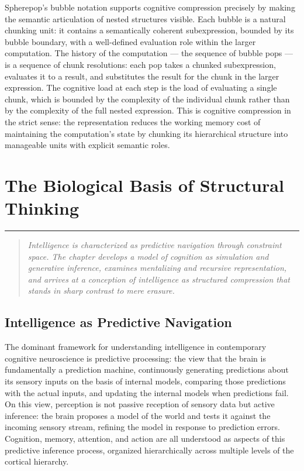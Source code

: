 \documentclass[12pt,openany]{book}
\theoremstyle{plain}
\theoremstyle{definition}
\theoremstyle{remark}
\newcommand{\chapterrule}{%
  \vspace{4pt}%
  {\color{SpherepopBlue}\rule{\textwidth}{0.8pt}}%
  \vspace{10pt}%
}
\newenvironment{chapterprecis}{%
  \begin{quote}\small\itshape}{%
  \end{quote}\medskip}
\begin{document}
Spherepop's bubble notation supports cognitive compression precisely by making the semantic articulation of nested structures visible. Each bubble is a natural chunking unit: it contains a semantically coherent subexpression, bounded by its bubble boundary, with a well-defined evaluation role within the larger computation. The history of the computation — the sequence of bubble pops — is a sequence of chunk resolutions: each pop takes a chunked subexpression, evaluates it to a result, and substitutes the result for the chunk in the larger expression. The cognitive load at each step is the load of evaluating a single chunk, which is bounded by the complexity of the individual chunk rather than by the complexity of the full nested expression. This is cognitive compression in the strict sense: the representation reduces the working memory cost of maintaining the computation's state by chunking its hierarchical structure into manageable units with explicit semantic roles.

\chapter{The Biological Basis of Structural Thinking}
\chapterrule

\begin{chapterprecis}
Intelligence is characterized as predictive navigation through
constraint space. The chapter develops a model of cognition as
simulation and generative inference, examines mentalizing and
recursive representation, and arrives at a conception of
intelligence as structured compression that stands in sharp
contrast to mere erasure.
\end{chapterprecis}

\section{Intelligence as Predictive Navigation}

The dominant framework for understanding intelligence in contemporary cognitive neuroscience is predictive processing: the view that the brain is fundamentally a prediction machine, continuously generating predictions about its sensory inputs on the basis of internal models, comparing those predictions with the actual inputs, and updating the internal models when predictions fail. On this view, perception is not passive reception of sensory data but active inference: the brain proposes a model of the world and tests it against the incoming sensory stream, refining the model in response to prediction errors. Cognition, memory, attention, and action are all understood as aspects of this predictive inference process, organized hierarchically across multiple levels of the cortical hierarchy.
\end{document}
